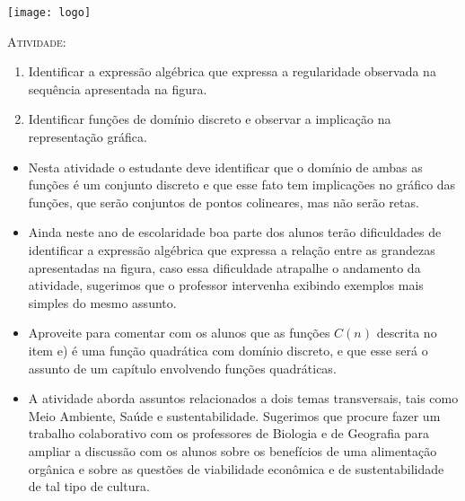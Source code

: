 \documentclass[10 pt,usenames,dvipsnames, oneside]{article}
\begin{document}
\begin{center}
  \begin{minipage}[l]{3cm}
\texttt{[image: logo]}    
\end{minipage}\hfill
\begin{minipage}[r]{.8\textwidth}
 {\Large \scshape Atividade: }  
\end{minipage}
\end{center}
\vspace{.2cm}

\ifdefined\prof
\begin{objetivos}
\item \phantom{a}
\end{objetivos}

\begin{goals}
\begin{enumerate}
\item Identificar a expressão algébrica que expressa a regularidade observada na sequência apresentada na figura.
\item Identificar funções de domínio discreto e observar a implicação na representação gráfica.
\end{enumerate}

\tcblower

\begin{itemize}
\item Nesta atividade o estudante deve identificar que o domínio de ambas as funções é um conjunto discreto e que esse fato tem implicações no gráfico das funções, que serão conjuntos de pontos colineares, mas não serão retas.
\item Ainda neste ano de escolaridade boa parte dos alunos terão dificuldades de identificar a expressão algébrica que expressa a relação entre as grandezas apresentadas na figura, caso essa dificuldade atrapalhe o andamento da atividade, sugerimos que o professor intervenha exibindo exemplos mais simples do mesmo assunto.
\item Aproveite para comentar com os alunos que as funções $C(n)$ descrita no item e) é uma função quadrática com domínio discreto, e que esse será o assunto de um capítulo envolvendo funções quadráticas.
\item A atividade aborda assuntos relacionados a dois temas transversais, tais como Meio Ambiente, Saúde e sustentabilidade. Sugerimos que procure fazer um trabalho colaborativo com os professores de Biologia e de Geografia para ampliar a discussão com os alunos sobre os benefícios de uma alimentação orgânica e sobre as questões de viabilidade econômica e de sustentabilidade de tal tipo de cultura. 

\end{itemize}

\end{goals}
\end{document}
